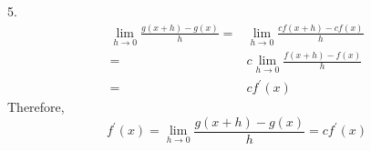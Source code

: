 5.
\begin{align*}
    \lim_{h\to0}\frac{g(x+h)-g(x)}{h}
    =&\lim_{h\to0}\frac{cf(x+h)-cf(x)}{h}\\
    =&c\lim_{h\to0}\frac{f(x+h)-f(x)}{h}\\
    =&cf^\prime(x)
\end{align*}
Therefore,
$$f^\prime(x)=\lim_{h\to0}\frac{g(x+h)-g(x)}{h}=cf^\prime(x)$$
